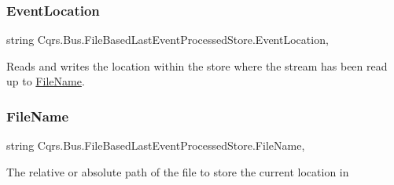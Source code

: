 \subsubsection{\texorpdfstring{Event\+Location}{EventLocation}}
{\footnotesize\ttfamily string Cqrs.\+Bus.\+File\+Based\+Last\+Event\+Processed\+Store.\+Event\+Location\hspace{0.3cm}{\ttfamily [get]}, {\ttfamily [set]}}



Reads and writes the location within the store where the stream has been read up to \hyperlink{classCqrs_1_1Bus_1_1FileBasedLastEventProcessedStore_af58c18745fa63aaa92f3f1921d582068_af58c18745fa63aaa92f3f1921d582068}{File\+Name}. 

\mbox{\label{classCqrs_1_1Bus_1_1FileBasedLastEventProcessedStore_af58c18745fa63aaa92f3f1921d582068_af58c18745fa63aaa92f3f1921d582068}} 
\subsubsection{\texorpdfstring{File\+Name}{FileName}}
{\footnotesize\ttfamily string Cqrs.\+Bus.\+File\+Based\+Last\+Event\+Processed\+Store.\+File\+Name\hspace{0.3cm}{\ttfamily [get]}, {\ttfamily [protected]}}



The relative or absolute path of the file to store the current location in 

